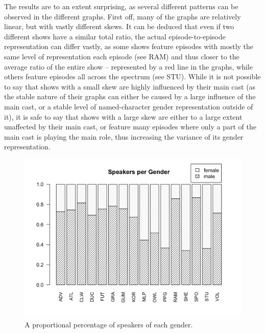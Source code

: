 \documentclass[a4paper, 11pt]{article}
\begin{document}
The results are to an extent surprising, as several different patterns can be observed in the different graphs. First off, many of the graphs are relatively linear, but with vastly different skews. It can be deduced that even if two different shows have a similar total ratio, the actual episode-to-episode representation can differ vastly, as some shows feature episodes with mostly the same level of representation each episode (see RAM) and thus closer to the average ratio of the entire show -- represented by a red line in the graphs, while others feature episodes all across the spectrum (see STU). While it is not possible to say that shows with a small skew are highly influenced by their main cast (as the stable nature of their graphs can either be caused by a large influence of the main cast, or a stable level of named-character gender representation outside of it), it is safe to say that shows with a large skew are either to a large extent unaffected by their main cast, or feature many episodes where only a part of the main cast is playing the main role, thus increasing the variance of its gender representation.

\begin{figure}[t!]
  \includegraphics[width=\linewidth]{figures/spkpergen.png}
  \caption{A proportional percentage of speakers of each gender.}
  \label{fig:spkpergen}
\end{figure}
\end{document}
